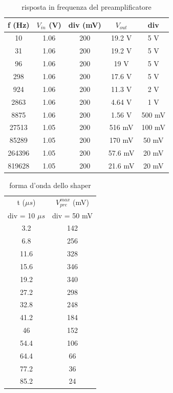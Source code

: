 \documentclass{article}
\begin{document}
\begin{table}[H]
    \centering
    \begin{tabular}{ccccc}
        \toprule
        f (Hz) & $V_{in}$ (V) & div (mV) & $V_{out}$ & div\\
        \midrule
        10 & 1.06 & 200 & 19.2 V & 5 V\\
        31 & 1.06 & 200 & 19.2 V& 5 V\\
        96 & 1.06 & 200 & 19 V& 5 V\\
        298 & 1.06 & 200 & 17.6 V& 5 V\\
        924 & 1.06 & 200 & 11.3 V& 2 V\\
        2863 & 1.06 & 200 & 4.64 V& 1 V\\
        8875 & 1.06 & 200 & 1.56 V& 500 mV\\
        27513 & 1.05 & 200 & 516 mV& 100 mV\\
        85289 & 1.05 & 200 & 170 mV& 50 mV\\
        264396 & 1.05 & 200 & 57.6 mV & 20 mV\\
        819628 & 1.05 & 200 & 21.6 mV& 20 mV\\
        \bottomrule
    \end{tabular}
    \caption{risposta in frequenza del preamplificatore}
\end{table}


\begin{table}[H]
    \centering
    \begin{tabular}{cc}
        \toprule
        t ($\mu s$)& $V_{pre}^{max}$ (mV) \\
        div = 10 $\mu s$ & div = 50 mV\\
        \midrule
        3.2 & 142 \\
        6.8 & 256 \\
        11.6 & 328 \\
        15.6 & 346 \\
        19.2 & 340 \\
        27.2 & 298 \\
        32.8 & 248 \\
        41.2 & 184 \\
        46 & 152 \\
        54.4 & 106 \\
        64.4 & 66 \\
        77.2 & 36 \\
        85.2 & 24 \\
        \bottomrule
    \end{tabular}
    \caption{forma d'onda dello shaper}
\end{table}
\end{document}
